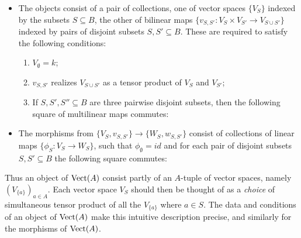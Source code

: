 \documentclass[a4paper]{amsart}
\begin{document}
\begin{itemize}
	\item The objects consist of a pair of collections, one of vector spaces $\{ V_S \}$ indexed by the subsets $S \subseteq B$, 
	the other of bilinear maps $ \{ v_{S,S'}: V_S \times V_{S'} \to V_{S \cup S'} \} $ 
	indexed by pairs of disjoint subsets $S, S' \subseteq B$. These are required to satisfy the following conditions:
	\begin{enumerate}
		\item $V_{\emptyset} = k$; 
		\item $v_{S,S'}$ realizes $V_{S \cup S'}$ as a tensor product of $V_S$ and $V_{S'}$;
		\item If $S, S', S'' \subseteq B$ are three pairwise disjoint subsets, then the following square of multilinear maps commutes:
	\begin{center}
	\end{center}
	\end{enumerate} 
	\item The morphisms from $\{ V_S, v_{S, S'} \} \to \{ W_S, w_{S, S'} \}$ consist of collections of linear maps $\{ \phi_S: V_S \to W_S \}$, such that $\phi_{\emptyset} = id$ and for each pair of disjoint subsets $S, S' \subseteq B$ the following square commutes:
	\begin{center}
	\end{center}
\end{itemize} 
Thus an object of $\mathrm{Vect}(A)$ consist partly of an $A$-tuple of vector spaces, namely $ (V_{\{a\}})_{a \in A}$. Each vector space $V_S$ should then be thought of as a {\em choice} of simultaneous tensor product of all the $V_{\{a\}}$ where $a \in S$. The data and conditions of an object of $\mathrm{Vect}(A)$ make this intuitive description precise, and similarly for the morphisms of $\mathrm{Vect}(A)$. 
\end{document}
